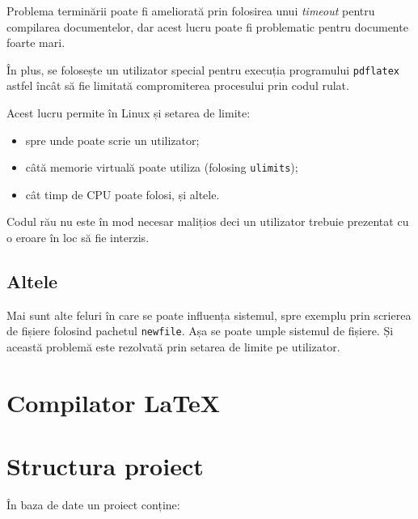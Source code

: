 \documentclass[a4wide,12pt]{report}
\newcommand{\eng}[1]{\emph{#1}} %
\newcommand{\cod}[1]{\texttt{#1}}
\begin{document}
Problema terminării poate fi ameliorată prin folosirea unui \eng{timeout} pentru
compilarea documentelor, dar acest lucru poate fi problematic pentru documente
foarte mari.

În plus, se folosește un utilizator special pentru execuția programului
\cod{pdflatex} astfel încât să fie limitată compromiterea procesului prin codul
rulat.

Acest lucru permite în Linux și setarea de limite:

\begin{itemize}

\item spre unde poate scrie un utilizator;

\item câtă memorie virtuală poate utiliza (folosing \cod{ulimits});

\item cât timp de CPU poate folosi, și altele.

\end{itemize}

Codul rău nu este în mod necesar malițios deci un utilizator trebuie prezentat
cu o eroare în loc să fie interzis.

\subsection{Altele}

Mai sunt alte feluri în care se poate influența sistemul, spre exemplu prin
scrierea de fișiere folosind pachetul \cod{newfile}. Așa se poate umple sistemul
de fișiere. Și această problemă este rezolvată prin setarea de limite pe
utilizator.

\section{Compilator \LaTeX}

\section{Structura proiect}

În baza de date un proiect conține:
\end{document}
